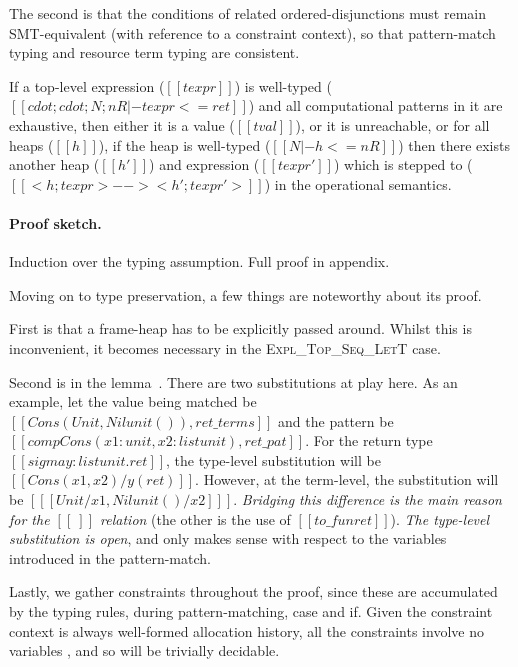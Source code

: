 The second is that the conditions of related ordered-disjunctions must remain
SMT-equivalent (with reference to a constraint context), so that pattern-match
typing and resource term typing are consistent.

\begin{theorem}
If a top-level expression ($[[ texpr ]]$) is well-typed
($[[ cdot ; cdot ; N ; nR |- texpr <= ret ]]$) and all computational patterns
in it are exhaustive, then either it is a value ($[[ tval ]]$), or it is
unreachable, or for all heaps ($[[ h ]]$), if the heap is well-typed
($[[ N |- h <= nR ]]$) then there exists another heap ($[[ h' ]]$) and expression
($[[ texpr' ]]$) which is stepped to ($[[ < h ; texpr > --> < h' ; texpr' > ]]$)
in the operational semantics.
\end{theorem}
\paragraph{Proof sketch.} Induction over the typing assumption. Full proof in
appendix.

Moving on to type preservation, a few things are noteworthy about its proof.

First is that a frame-heap has to be explicitly passed around.  Whilst this is
inconvenient, it becomes necessary in the \textsc{Expl\_Top\_Seq\_LetT} case.

Second is in the lemma~.
There are two substitutions at play here. As an example, let
the value being matched be $[[ Cons ( Unit , Nil unit ( ) ) , ret\_terms ]]$ and
the pattern be $[[ comp Cons ( x1 : unit , x2 : list unit ) , ret\_pat ]]$.
For the return type $[[ sigma y : list unit . ret ]]$, the type-level
substitution will be $[[ Cons ( x1 , x2 ) / y ( ret )]]$.  However, at the
term-level, the substitution will be $[[ [ Unit / x1 , Nil unit ( ) / x2 ] ]]$.
\emph{Bridging this difference is the main reason for the $[[ ~ ]]$ relation}
(the other is the use of $[[ to\_fun ret ]]$).  \emph{The type-level substitution
is open}, and only makes sense with respect to the variables introduced in the
pattern-match.

Lastly, we gather constraints throughout the proof, since these are accumulated
by the typing rules, during pattern-matching, case and if. Given the constraint
context is always well-formed
allocation history, all the constraints involve no variables
, and so will be trivially decidable.

